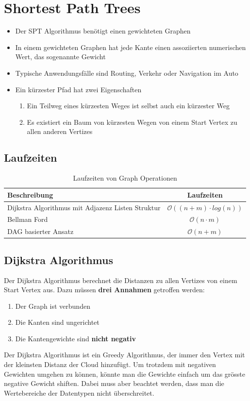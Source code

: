 \section{Shortest Path Trees}
\begin{itemize}
	\item Der SPT Algorithmus benötigt einen gewichteten Graphen
	\item In einem gewichteten Graphen hat jede Kante einen assoziierten numerischen Wert, das sogenannte Gewicht
	\item Typische Anwendungsfälle sind Routing, Verkehr oder Navigation im Auto
	\item Ein kürzester Pfad hat zwei Eigenschaften
	\begin{enumerate}
		\item Ein Teilweg eines kürzesten Weges ist selbst auch ein kürzester Weg
		\item Es existiert ein Baum von kürzesten Wegen von einem Start Vertex zu allen anderen Vertizes
	\end{enumerate}
\end{itemize}

\subsection{Laufzeiten}
\begin{table}[h]
	\centering
	\begin{tabu} to \linewidth {l c}
		\toprule
		Beschreibung & Laufzeiten \\
		\midrule
		Dijkstra Algorithmus mit Adjazenz Listen Struktur & $\mathcal{O}((n+m) \cdot log(n))$\\
		Bellman Ford & $\mathcal{O}(n\cdot m)$ \\
		DAG basierter Ansatz & $\mathcal{O}(n+m)$\\
		\bottomrule
	\end{tabu}
	\caption{Laufzeiten von Graph Operationen}
\end{table}

\clearpage

\subsection{Dijkstra Algorithmus}
Der Dijkstra Algorithmus berechnet die Distanzen zu allen Vertizes von einem Start Vertex aus. Dazu müssen \textbf{drei Annahmen} getroffen werden:
\begin{enumerate}
	\item Der Graph ist verbunden
	\item Die Kanten sind ungerichtet
	\item Die Kantengewichte sind \textbf{nicht negativ}
\end{enumerate}
Der Dijkstra Algorithmus ist ein Greedy Algorithmus, der immer den Vertex mit der kleinsten Distanz der Cloud hinzufügt. Um trotzdem mit negativen Gewichten umgehen zu können, könnte man die Gewichte einfach um das grösste negative Gewicht shiften. Dabei muss aber beachtet werden, dass man die Wertebereiche der Datentypen nicht überschreitet.

